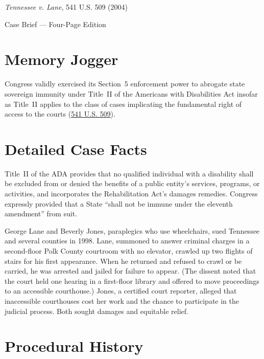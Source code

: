 \documentclass[12pt]{article}
\begin{document}
\begin{center}
{\LARGE \textit{Tennessee v. Lane}, 541 U.S. 509 (2004)\par}
\vspace{0.8em}
{\large Case Brief --- Four-Page Edition\par}
\end{center}
\vspace{1em}

\section{Memory Jogger}

Congress validly exercised its Section~5 enforcement power to abrogate state sovereign immunity under Title~II of the Americans with Disabilities Act insofar as Title~II applies to the class of cases implicating the fundamental right of access to the courts (\href{https://www.law.cornell.edu/supremecourt/text/541/509}{541 U.S. 509}).

\section{Detailed Case Facts}

Title~II of the ADA provides that no qualified individual with a disability shall be excluded from or denied the benefits of a public entity's services, programs, or activities, and incorporates the Rehabilitation Act's damages remedies. Congress expressly provided that a State ``shall not be immune under the eleventh amendment'' from suit.

George Lane and Beverly Jones, paraplegics who use wheelchairs, sued Tennessee and several counties in 1998. Lane, summoned to answer criminal charges in a second-floor Polk County courtroom with no elevator, crawled up two flights of stairs for his first appearance. When he returned and refused to crawl or be carried, he was arrested and jailed for failure to appear. (The dissent noted that the court held one hearing in a first-floor library and offered to move proceedings to an accessible courthouse.) Jones, a certified court reporter, alleged that inaccessible courthouses cost her work and the chance to participate in the judicial process. Both sought damages and equitable relief.

\section{Procedural History}
\end{document}
